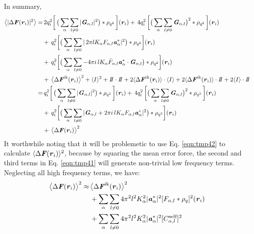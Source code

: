 \documentclass[aps,pre,preprint]{revtex4}
\renewcommand{\v}[1]{\textbf{\textit{#1}}}
\begin{document}
In summary,
\begin{align}\nonumber
  \big\langle
  \vert \Delta\v F(\v r_i)\vert^2
  \big\rangle
  =&\, 
  2q_i^2
  \bigg[\,
  \big(
  \sum_{\alpha} \sum_{l\neq 0}
  \vert \v G_{\alpha,l}\vert^2
  \big)
  \ast \rho_{q^2}
  \,\bigg] (\v r_i)
  +\,
  4q_i^2\,
  \bigg[
  \big(
  \sum_{\alpha} \sum_{l\neq 0}  
  \v G_{\alpha,l}
  \big)^2
  \ast \rho_{q^2}\,
  \bigg] (\v r_i) \\\nonumber
  & +\,
  q_i^2
  \bigg[
  \big(
  \sum_{\alpha}\sum_{l\neq 0}
  \vert\,
  2\pi l K_\alpha F_{\alpha,l} \v a_\alpha^\ast\vert^2
  \big)
  \ast \rho_{q^2}
  \bigg]
  (\v r_i) \\\nonumber
  & +\,
  q^2_i
  \bigg[
  \big(
  \sum_{\alpha}\sum_{l\neq 0}
  -4\pi i\,l K_\alpha \bar F_{\alpha,l}\v a_\alpha ^\ast\cdot\v G_{\alpha,l} 
  \big)\ast \rho_{q^2}
  \bigg] (\v r_i) \\\nonumber
  &+\,
  \big\langle
  \Delta\v F^{\textrm{ik}}(\v r_i)
  \big\rangle  ^2 +
  \langle I\rangle^2  + I\negthickspace I\cdot I\negthickspace I
  + 2\langle\Delta\v F^{\textrm{ik}}(\v r_i)\rangle \cdot\langle I\rangle
  + 2\langle\Delta\v F^{\textrm{ik}}(\v r_i)\rangle\cdot I\negthickspace I
  + 2\langle I\rangle\cdot I\negthickspace I \\\nonumber
  =&\,
  q_i^2
  \bigg[\,
  \big(
  \sum_{\alpha} \sum_{l\neq 0}
  \vert \v G_{\alpha,l}\vert^2
  \big)
  \ast \rho_{q^2}
  \,\bigg] (\v r_i)
  +\,
  4q_i^2\,
  \bigg[
  \big(
  \sum_{\alpha} \sum_{l\neq 0}  
  \v G_{\alpha,l}
  \big)^2
  \ast \rho_{q^2}\,
  \bigg] (\v r_i) \\\nonumber
  & +\,
  q_i^2
  \bigg[
  \big(
  \sum_{\alpha}\sum_{l\neq 0}
  \vert
  \v G_{\alpha,l} + 2\pi i\,l K_\alpha F_{\alpha,l} \v a_\alpha^\ast\vert^2
  \big)
  \ast \rho_{q^2}
  \bigg]
  (\v r_i) \\
  & +\,
  \big\langle \Delta\v F(\v r_i)\big\rangle ^2
\end{align}
It worthwhile noting that it will be problemetic to use
Eq. \eqref{eqn:tmp42} to calculate $\langle \Delta\v F(\v r_i)\rangle
^2$, because by squaring the mean error force, the second and third
terms in Eq. \eqref{eqn:tmp41} will generate non-trivial low frequency
terms. Neglecting all high frequency terms, we have:
\begin{align}\nonumber
  \big\langle \Delta\v F(\v r_i)\big\rangle ^2
  \approx&\,
  \big\langle \Delta\v F^{\textrm{ik}}(\v r_i)\big\rangle ^2 \\\nonumber
  &\,
  +\sum_{\alpha}\sum_{l\neq 0}
  4\pi^2l^2K_\alpha^2\vert\v a_{\alpha}^\ast\vert^2[F_{\alpha,l}\ast\rho_q]^2 (\v r_i) \\
  &\,
  +\sum_{\alpha}\sum_{l\neq 0}
  4\pi^2l^2K_\alpha^2\vert\v a_{\alpha}^\ast\vert^2[C_{\alpha,l}^{\textrm{self}}]^2 
\end{align}
\end{document}
